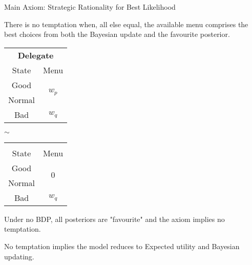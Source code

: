 \documentclass[usenames,dvipsnames,aspectratio=169,11pt, envcountsect, handout]{beamer}
\begin{document}
\begin{frame}[noframenumbering]{Main Axiom: Strategic Rationality for Best Likelihood}

	\begin{axiom}
		There is no temptation when, all else equal, the available menu comprises the best choices from both the Bayesian update and the favourite posterior.
	\end{axiom}

	\vfill

	\begin{table}[H]
		\centering
		\begin{minipage}{0.4\textwidth}
			\centering
			\begin{tabular}{c | c}
				\multicolumn{2}{c}{\textbf{Delegate}}                           \\
				State                & Menu                                     \\
				\hline
				{\color{blue}Good}   & \multirow{2}{*}{{\color{blue}\( w_p \)}} \\
				{\color{blue}Normal} &                                          \\
				Bad                  & \( w_q \)                                \\
			\end{tabular}
			\vspace{0.5cm} %
		\end{minipage}%
		\( \sim \)
		\begin{minipage}{0.4\textwidth}
			\centering
			\begin{tabular}{c | c}
				\multicolumn{2}{c}{}                                          \\
				State                & Menu                                   \\
				\hline
				{\color{blue}Good}   & \multirow{2}{*}{{\color{blue}\( 0 \)}} \\
				{\color{blue}Normal} &                                        \\
				Bad                  & \( w_q \)                              \\
			\end{tabular}
			\vspace{0.5cm} %
		\end{minipage} %
	\end{table} \pause

	\vfill

	Under no BDP, all posteriors are "favourite" and the axiom implies no temptation.

	\vfill

	No temptation implies the model reduces to Expected utility and Bayesian updating.
\end{frame}
\end{document}
